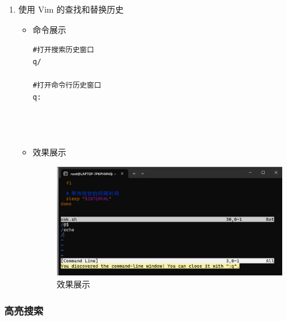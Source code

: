 \documentclass[UTF8]{ctexart}
\begin{document}
\begin{enumerate}
  \item 使用 Vim 的查找和替换历史
  \begin{itemize}
  \item 命令展示
  \begin{verbatim}
#打开搜索历史窗口
q/

#打开命令行历史窗口
q:


    
  \end{verbatim}

  \item 效果展示
  \begin{figure}[H]
    \centering
    \includegraphics[width=\textwidth]{24} %
    \caption{效果展示}
  
  \end{figure}
\end{itemize}
\end{enumerate}
\subsubsection{高亮搜索}
\end{document}
